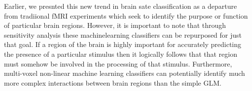 \documentclass[twocolumn,final]{article}
\begin{document}
Earlier, we presnted this new trend in brain sate classification as a departure from tradiional fMRI experiments which seek to identify the purpose or function of particular brain regions.
However, it is important to note that through sensitivity analysis these machinelearning classifiers can be repurposed for just that goal.
If a region of the brain is highly important for accurately predicting the presence of a particular stimulus then it logically follows that that region must somehow be involved in the processing of that stimulus.
Furthermore, multi-voxel non-linear machine learning classifiers can potentially identify much more complex interactions between brain regions than the simple GLM.



\end{document}
